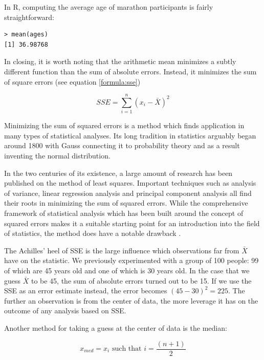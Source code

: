 \documentclass{tufte-book} %
\begin{document}
In R, computing the average age of marathon participants is fairly straightforward:

\begin{Verbatim}
> mean(ages)
[1] 36.98768
\end{Verbatim}

In closing, it is worth noting that the arithmetic mean minimizes a subtly different function than the sum of absolute errors. Instead, it minimizes the sum of square errors (see equation \ref{formula:sse})

\begin{equation} \label{formula:sse}
	SSE = \sum_{i=1}^n (x_i - \bar{X})^2
\end{equation}

\begin{tcolorbox}
Minimizing the sum of squared errors is a method which finds application in many types of statistical analyses. Its long tradition in statistics arguably began around 1800 with Gauss connecting it to probability theory and as a result inventing the normal distribution.
\end{tcolorbox}

In the two centuries of its existence, a large amount of research has been published on the method of least squares. Important techniques such as analysis of variance, linear regression analysis and principal component analysis all find their roots in minimizing the sum of squared errors. While the comprehensive framework of statistical analysis which has been built around the concept of squared errors makes it a suitable starting point for an introduction into the field of statistics, the method does have a notable drawback \cite{Abdi2007}.

The Achilles' heel of SSE is the large influence which observations far from $\bar{X}$ have on the statistic. We previously experimented with a group of 100 people: 99 of which are 45 years old and one of which is 30 years old. In the case that we guess $\bar{X}$ to be 45, the sum of absolute errors turned out to be 15. If we use the SSE as an error estimate instead, the error becomes $(45 - 30) ^2 = 225$. The further an observation is from the center of data, the more leverage it has on the outcome of any analysis based on SSE.

Another method for taking a guess at the center of data is the median:

\begin{equation} \label{formula:median}
	x_{med} = x_i \mbox{ such that } i = \frac{(n + 1)}{2}
\end{equation}
\end{document}
